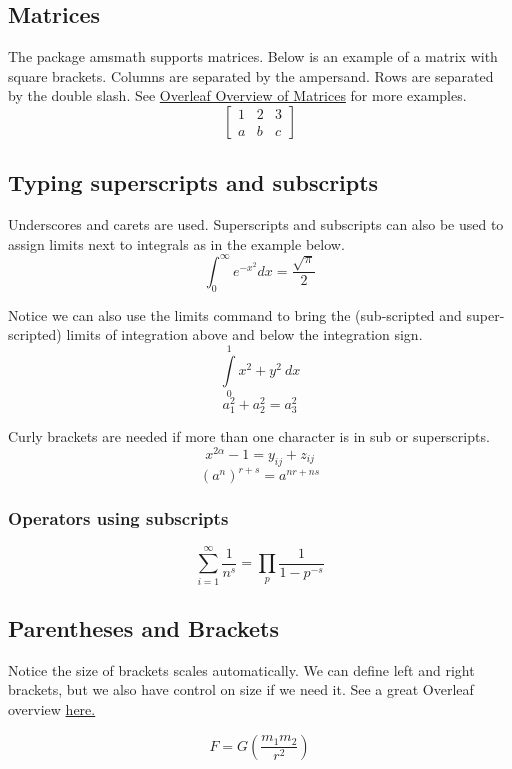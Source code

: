\documentclass{article}
\begin{document}
\subsection{Matrices}
The package amsmath supports matrices.  Below is an example of a matrix with square brackets.  Columns are separated by the ampersand.  Rows are separated by the double slash.  See \href{https://www.overleaf.com/learn/latex/Matrices}{Overleaf Overview of Matrices} for more examples.
\begin{equation}
\begin{bmatrix}
1 & 2 & 3\\
a & b & c
\end{bmatrix}
\end{equation}

\subsection{Typing superscripts and subscripts}
Underscores and carets are used.
Superscripts and subscripts can also be used to assign limits next to integrals as in the example below.
\begin{equation*}
    \int_0^\infty e^{-x^2} dx=\frac{\sqrt{\pi}}{2}
\end{equation*}

Notice we can also use the limits command to bring the (sub-scripted and super-scripted) limits of integration above and below the integration sign.
\[ \int\limits_0^1 x^2 + y^2 \ dx \]
\[ a_1^2 + a_2^2 = a_3^2 \]

Curly brackets are needed if more than one character is in sub or superscripts.
\[ x^{2 \alpha} - 1 = y_{ij} + z_{ij}  \]
\[ (a^n)^{r+s} = a^{nr+ns}  \]

\subsubsection{Operators using subscripts}
\[ \sum_{i=1}^{\infty} \frac{1}{n^s}
= \prod_p \frac{1}{1 - p^{-s}} \]

\subsection{Parentheses and Brackets}
Notice the size of brackets scales automatically.  We can define left and right brackets, but we also have control on size if we need it.  See a great Overleaf overview \href{https://www.overleaf.com/learn/latex/Brackets_and_Parentheses}{here.}

\[ F = G \left( \frac{m_1 m_2}{r^2} \right) \]
\end{document}

